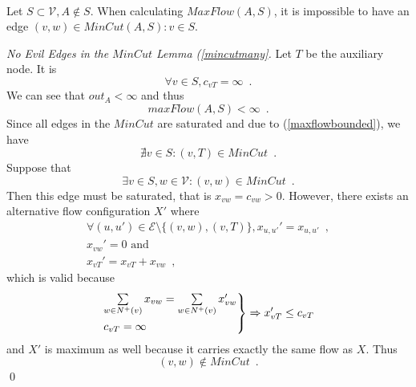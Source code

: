 
    \begin{lemma} \ \\
       \label{mincutmany}
       Let $S \subset \mathcal{V}, A \notin S$. When calculating $MaxFlow\left(A, S\right)$, it is impossible to have an edge
       $\left(v, w\right) \in MinCut\left(A, S\right) : v \in S$.
    \end{lemma}
    \begin{proof}[No Evil Edges in the $MinCut$ Lemma (\ref{mincutmany}]
    \label{mincutmanyproof}
       Let $T$ be the auxiliary node. It is
       \begin{equation}
          \forall v \in S, c_{vT} = \infty \enspace.
       \end{equation}
       We can see that $out_A < \infty$ and thus
       \begin{equation}
       \label{maxflowbounded}
          maxFlow\left(A, S\right) < \infty \enspace.
       \end{equation}
       Since all edges in the $MinCut$ are saturated and due to (\ref{maxflowbounded}), we have
       \begin{equation}
          \nexists v \in S : \left(v, T\right) \in MinCut \enspace.
       \end{equation}
       Suppose that
       \begin{equation}
          \exists v \in S, w \in \mathcal{V} : \left(v, w\right) \in MinCut \enspace.
       \end{equation}
       Then this edge must be saturated, that is $x_{vw} = c_{vw} > 0$. However, there exists an alternative flow
       configuration $X'$ where
       \begin{equation}
       \begin{gathered}
          \forall \left(u, u'\right) \in \mathcal{E} \setminus \{\left(v, w\right), \left(v, T\right)\}, x_{u,u'}' =
          x_{u,u'} \enspace, \\
          x_{vw}' = 0 \mbox{ and} \\
          x_{vT}' = x_{vT} + x_{vw} \enspace,
       \end{gathered}
       \end{equation}
       which is valid because
       \begin{equation}
          \begin{rcases}
             \sum\limits_{w \in N^{+}\left(v\right)}x_{vw} = \sum\limits_{w \in N^{+}\left(v\right)}x_{vw}' \\
             c_{vT} = \infty
          \end{rcases}
          \Rightarrow x_{vT}' \leq c_{vT}
       \end{equation}
       and $X'$ is maximum as well because it carries exactly the same flow as $X$. Thus
       \begin{equation}
          \left(v, w\right) \notin MinCut \enspace.
       \end{equation}
       \qed
    \end{proof}

